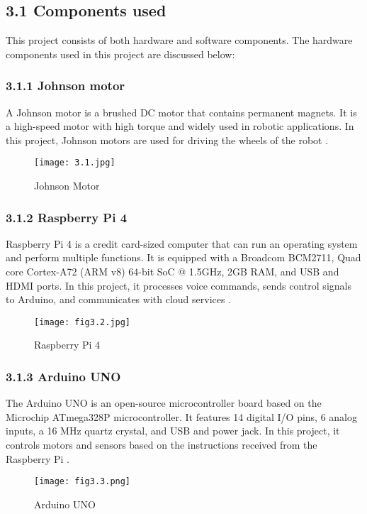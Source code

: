 \subsection*{3.1 Components used}
This project consists of both hardware and software components. The hardware components used in this project are discussed below:

\subsubsection*{3.1.1 Johnson motor}
A Johnson motor is a brushed DC motor that contains permanent magnets. It is a high-speed motor with high torque and widely used in robotic applications. In this project, Johnson motors are used for driving the wheels of the robot .

\begin{figure}[H]
    \centering
    \texttt{[image: 3.1.jpg]}
    \caption{Johnson Motor}
    \label{fig:3.1}\cite{7}
\end{figure}

\subsubsection*{3.1.2 Raspberry Pi 4}
Raspberry Pi 4 is a credit card-sized computer that can run an operating system and perform multiple functions. It is equipped with a Broadcom BCM2711, Quad core Cortex-A72 (ARM v8) 64-bit SoC @ 1.5GHz, 2GB RAM, and USB and HDMI ports. In this project, it processes voice commands, sends control signals to Arduino, and communicates with cloud services .

\begin{figure}[H]
    \centering
    \texttt{[image: fig3.2.jpg]}
    \caption{Raspberry Pi 4}
    \label{fig:3.2}\cite{8}
\end{figure}

\subsubsection*{3.1.3 Arduino UNO}
The Arduino UNO is an open-source microcontroller board based on the Microchip ATmega328P microcontroller. It features 14 digital I/O pins, 6 analog inputs, a 16 MHz quartz crystal, and USB and power jack. In this project, it controls motors and sensors based on the instructions received from the Raspberry Pi .

\begin{figure}[H]
    \centering
    \texttt{[image: fig3.3.png]}
    \caption{Arduino UNO}
    \label{fig:3.3}\cite{9}
\end{figure}

